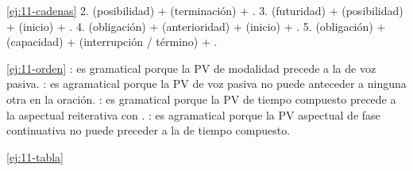 \begin{solucion}{\ref{ej:11-cadenas}}
2.  (posibilidad) +  (terminación) +
. 3.  (futuridad) +  (posibilidad) +
 (inicio) + . 4.  (obligación) +
 (anterioridad) +  (inicio) + . 5.
 (obligación) +  (capacidad) + 
(interrupción / término) + .
\end{solucion}

\begin{solucion}{\ref{ej:11-orden}}
: es gramatical porque la PV de modalidad precede a la de
voz pasiva. : es agramatical porque la PV de voz pasiva no
puede anteceder a ninguna otra en la oración. : es
gramatical porque la PV de tiempo compuesto precede a la aspectual reiterativa
con . : es agramatical porque la PV
aspectual de fase continuativa no puede preceder a la de tiempo
compuesto.
\end{solucion}

\begin{solucion}{\ref{ej:11-tabla}}
\begin{center}
\end{center}
\end{solucion}

